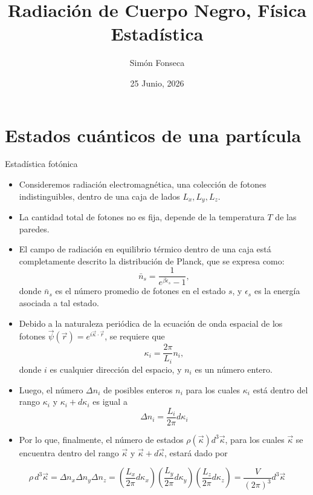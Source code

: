 \documentclass[aspectratio=1610]{beamer}
\title{Radiación de Cuerpo Negro, Física Estadística}
\author{Simón Fonseca}
\date{25 Junio, 2026}
\newcommand{\kv}{\Vec{\kappa}}
\begin{document}
\maketitle

\section{Estados cuánticos de una partícula}
\begin{frame}{Estadística fotónica}{}
	\begin{itemize}
		\item Consideremos radiación electromagnética, una colección de fotones indistinguibles, dentro de una caja de lados $L_x,L_y,L_z$.
		\item La cantidad total de fotones no es fija, depende de la temperatura $T$ de las paredes.\pause
		\item El campo de radiación en equilibrio térmico dentro de una caja está completamente descrito la distribución de Planck, que se expresa como:
		\begin{equation}
			\bar{n}_s = \frac{1}{e^{\beta \epsilon_s}-1},
			\label{eq:planck}
		\end{equation}
		donde $\bar{n}_s$ es el número promedio de fotones en el estado $s$, y $\epsilon_s$ es la energía asociada a tal estado.
	\end{itemize}
\end{frame}

\begin{frame}
	\begin{itemize}
		\item Debido a la naturaleza periódica de la ecuación de onda espacial de los fotones $\vec{\psi}(\vec{r})=e^{i\kv\cdot\vec{r}}$, se requiere que
		\begin{equation}
			\kappa_i=\frac{2\pi}{L_i}n_i ,
		\end{equation}
		donde $i$ es cualquier dirección del espacio, y $n_i$ es un número entero.\pause
		\item Luego, el número $\Delta n_i$ de posibles enteros $n_i$ para los cuales $\kappa_i$ está dentro del rango $\kappa_i$ y $\kappa_i+d\kappa_i$ es igual a
		\begin{equation}
			\Delta n_i=\frac{L_i}{2\pi}d\kappa_i
		\end{equation}\pause
		\item Por lo que, finalmente, el número de estados $\rho(\kv)d^3\kv$, para los cuales $\kv$ se encuentra dentro del rango $\kv$ y $\kv+d\kv$, estará dado por
	\end{itemize}
	
	\begin{equation}
		\rho \, d^3\kv = \Delta n_x \Delta n_y \Delta n_z = \left(\frac{L_x}{2\pi}d\kappa_x \right) \left(\frac{L_y}{2\pi}d\kappa_y \right) \left(\frac{L_z}{2\pi}d\kappa_z \right) = \frac{V}{(2\pi)^3}d^3\kv
		\label{eq:NumEstados}
	\end{equation}
\end{frame}
	
\end{document}
